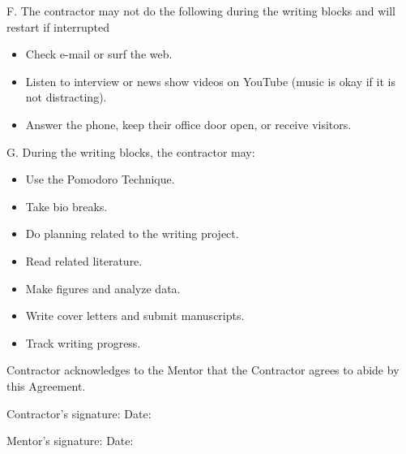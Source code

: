 \documentclass[10pt]{article}
\begin{document}
F. The contractor may not do the following during the writing blocks and will restart if interrupted

\begin{itemize}
\item Check e-mail or surf the web.
\item Listen to interview or news show videos on YouTube (music is okay if it is not distracting).
\item Answer the phone, keep their office door open, or receive visitors.
\end{itemize}

G. During the writing blocks, the contractor may: 

\begin{itemize}
\item Use the Pomodoro Technique.
\item Take bio breaks.
\item Do planning related to the writing project.
\item Read related literature.
\item Make figures and analyze data.
\item Write cover letters and submit manuscripts.
\item Track writing progress.
\end{itemize}

Contractor acknowledges to the Mentor that the Contractor agrees to abide by this Agreement.

Contractor's signature:  \hspace{2in}  Date: 

Mentor's signature:  \hspace{2.22in}  Date:
\end{document}
